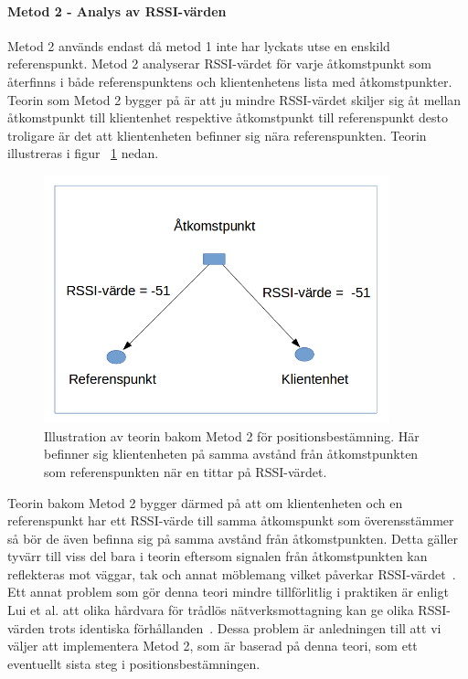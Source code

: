\documentclass[a4paper,12pt]{article}
\begin{document}
 \paragraph{Metod 2 - Analys av RSSI-värden}
 \leavevmode\newline
Metod 2 används endast då metod 1 inte har lyckats utse en enskild referenspunkt. Metod 2  analyserar RSSI-värdet för varje åtkomstpunkt som återfinns i både referenspunktens och klientenhetens lista med åtkomstpunkter.
Teorin som Metod 2 bygger på är att ju mindre RSSI-värdet skiljer sig åt mellan åtkomstpunkt till klientenhet respektive åtkomstpunkt till referenspunkt desto troligare är det att
klientenheten befinner sig nära referenspunkten.
Teorin illustreras i figur ~\ref{fig:TEO2} nedan.

 \begin{figure}[H]
   \centering
   \includegraphics[width=10cm]{media/TeoriMetod2.png}
   \caption{Illustration av teorin bakom Metod 2 för positionsbestämning. Här befinner sig klientenheten på samma avstånd från åtkomstpunkten som referenspunkten när en tittar på RSSI-värdet.}
   \label{fig:TEO2}
 \end{figure}

 Teorin bakom Metod 2 bygger därmed på att om klientenheten och en referenspunkt har ett RSSI-värde till samma åtkomspunkt som överensstämmer så bör de även befinna sig på samma avstånd från åtkomstpunkten. Detta gäller tyvärr till viss del bara i teorin eftersom signalen från åtkomstpunkten kan reflekteras mot väggar, tak och annat möblemang vilket påverkar RSSI-värdet~\cite{zanca2008experimental}. Ett annat problem som gör denna teori mindre tillförlitlig i praktiken är enligt Lui et al. att olika hårdvara för trådlös nätverksmottagning kan ge olika RSSI-värden trots identiska förhållanden~\cite{problem_with_RSSI}. Dessa problem är anledningen till att vi väljer att implementera Metod 2, som är baserad på denna teori, som ett eventuellt sista steg i positionsbestämningen.
\end{document}
